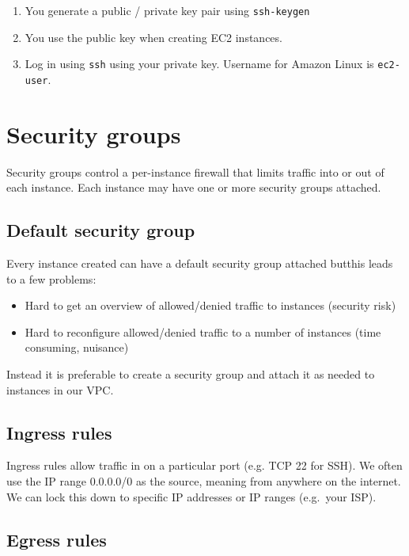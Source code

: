 \begin{enumerate}
\item
  You generate a public / private key pair using \texttt{ssh-keygen}
\item
  You use the public key when creating EC2 instances.
\item
  Log in using \texttt{ssh} using your private key.
  Username for Amazon Linux is \texttt{ec2-user}.
\end{enumerate}


\section{Security groups}
\label{security-groups}

Security groups control a per-instance firewall that limits traffic into or out of each instance.
Each instance may have one or more security groups attached.

\subsection{Default security group}

Every instance created can have a default security group attached butthis leads to a few problems:

\begin{itemize}
\item
  Hard to get an overview of allowed/denied traffic to instances
  (security risk)
\item
  Hard to reconfigure allowed/denied traffic to a number of instances
  (time consuming, nuisance)
\end{itemize}

Instead it is preferable to create a security group and attach it as needed to instances in our VPC.

\subsection{Ingress rules}\label{sec:ingress-rules}

Ingress rules allow traffic in on a particular port (e.g. TCP 22 for SSH). 
We often use the IP range 0.0.0.0/0 as the source, meaning from anywhere on the internet.
We can lock this down to specific IP addresses or IP ranges (e.g.~your ISP). 

\subsection{Egress rules}\label{sec:egress-rules}

